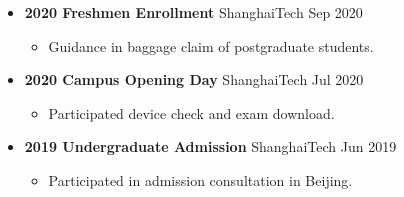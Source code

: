 \documentclass[a4paper,10pt]{ctexart} %
\begin{document}
        \begin{itemize}
            \item \textbf{2020 Freshmen Enrollment} \hfill ShanghaiTech \quad Sep 2020
                \begin{small} \begin{itemize}
                    \item Guidance in baggage claim of postgraduate students.
                \end{itemize} \end{small}
            \item \textbf{2020 Campus Opening Day} \hfill ShanghaiTech \quad Jul 2020
                \begin{small} \begin{itemize}
                    \item Participated device check and exam download.
                \end{itemize} \end{small}
            \item \textbf{2019 Undergraduate Admission} \hfill ShanghaiTech \quad Jun 2019
                \begin{small} \begin{itemize}
                    \item Participated in admission consultation in Beijing.
                \end{itemize} \end{small}
        \end{itemize}
\end{document}
